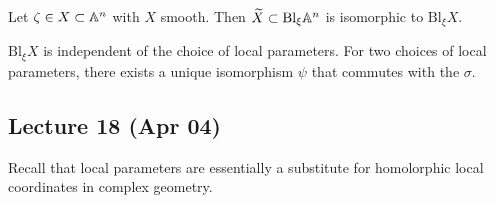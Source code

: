\documentclass[twoside, 10pt]{article}
\begin{document}
    \begin{thm} Let $\zeta \in X \subset \mathbb{A}^n$ with $X$ smooth. Then
    $\widetilde{X} \subset \mathrm{Bl}_{\xi} \mathbb{A}^n$ is isomorphic to
$\mathrm{Bl}_{\xi} X$.  \end{thm}

    \begin{thm} $\mathrm{Bl}_{\xi} X$ is independent of the choice of local
    parameters.  For two choices of local parameters, there exists a unique
isomorphism $\psi$ that commutes with the $\sigma$.  \end{thm}

    \subsection{Lecture 18 (Apr 04)} Recall that local parameters are
    essentially a substitute for homolorphic local coordinates in complex
    geometry. 
\end{document}
